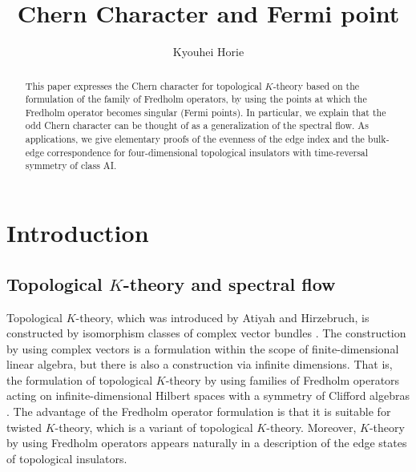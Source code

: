 \documentclass{amsart}
\title[Chern Character and Fermi point]
{Chern Character and Fermi point}
\author[K. Horie]{Kyouhei Horie}
\date{}
\theoremstyle{definition}
\theoremstyle{remark}
\begin{document}
\begin{abstract}
This paper expresses the Chern character for topological $K$-theory based on the formulation of the family of Fredholm operators, by using the points at which the Fredholm operator becomes singular (Fermi points). In particular, we explain that the odd Chern character can be thought of as a generalization of the spectral flow. As applications, we give elementary proofs of the evenness of the edge index and the bulk-edge correspondence for four-dimensional topological insulators with time-reversal symmetry of class AI.
\end{abstract}


\maketitle

\tableofcontents





\section{Introduction}
\label{sec:introduction}


\subsection{Topological $K$-theory and spectral flow}


Topological $K$-theory, which was introduced by Atiyah and Hirzebruch, is constructed by isomorphism classes of complex vector bundles \cite{A1}. 
The construction by using complex vectors is a formulation within the scope of finite-dimensional linear algebra, but there is also a construction via infinite dimensions. That is, the formulation of topological $K$-theory by using families of Fredholm operators acting on infinite-dimensional Hilbert spaces with a symmetry of Clifford algebras \cite{A-Si}.
The advantage of the Fredholm operator formulation is that it is suitable for twisted $K$-theory, which is a variant of topological $K$-theory.
Moreover, $K$-theory by using Fredholm operators appears naturally in a description of  the edge states of topological insulators.

\medskip
\end{document}

